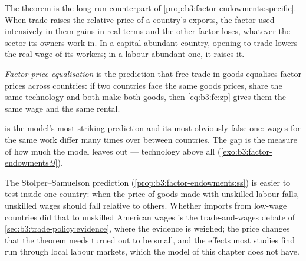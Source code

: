 The theorem is the long-run counterpart of \cref{prop:b3:factor-endowments:specific}.
When trade raises the relative price of a country's exports, the factor used
intensively in them gains in real terms and the other factor loses, whatever
the sector its owners work in. In a capital-abundant country, opening to trade
lowers the real wage of its workers; in a labour-abundant one, it raises it.

\begin{omfigure}
\par{}
\end{omfigure}

\begin{definition}\label{def:b3:factor-endowments:fpe}
\emph{Factor-price equalisation} is the prediction that free trade in goods
equalises factor prices across countries: if two countries face the same goods
prices, share the same technology and both make both goods, then
\eqref{eq:b3:fe:zp} gives them the same wage and the same rental.
\end{definition}

 is the model's most striking prediction and its most
obviously false one: wages for the same work differ many times over between
countries. The gap is the measure of how much the model leaves out ---
technology above all (\cref{exo:b3:factor-endowments:9}).

The Stolper--Samuelson prediction (\cref{prop:b3:factor-endowments:ss}) is easier to test inside one country: when
the price of goods made with unskilled labour falls, unskilled wages should fall
relative to others. Whether imports from low-wage countries did that to unskilled
American wages is the trade-and-wages debate of \cref{sec:b3:trade-policy:evidence},
where the evidence is weighed; the price changes that the theorem needs turned out
to be small, and the effects most studies find run through local labour markets,
which the model of this chapter does not have.

